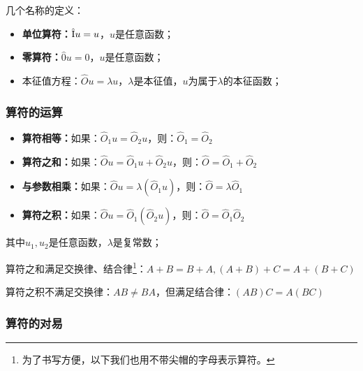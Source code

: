 几个名称的定义：

\begin{itemize}
    \item \textbf{单位算符：}$\hat {\rm I}u = u$，$u$是任意函数；
    \item \textbf{零算符：}$\hat 0u = 0$，$u$是任意函数；
    \item 本征值方程：$\hat O u = \lambda u$，$\lambda$是本征值，$u$为属于$\lambda$的本征函数；
\end{itemize}

\subsubsection{算符的运算}

\begin{itemize}
    \item \textbf{算符相等：}如果：$\hat O_1 u = \hat O_2 u$，则：$\hat O_1 = \hat O_2$
    \item \textbf{算符之和：}如果：$\hat O u = \hat O_1 u + \hat O_2 u$，则：$\hat O = \hat O_1 + \hat O_2$
    \item \textbf{与参数相乘：}如果：$\hat O u = \lambda (\hat O_1 u)$，则：$\hat O = \lambda \hat O_1$
    \item \textbf{算符之积：}如果：$\hat O u = \hat O_1 (\hat O_2 u)$，则：$\hat O = \hat O_1 \hat O_2$
\end{itemize}
其中$u_1 ,u_2 $是任意函数，$\lambda$是复常数；

算符之和满足交换律、结合律\footnote{为了书写方便，以下我们也用不带尖帽的字母表示算符。}：$A + B = B + A,\left( {A + B} \right) + C = A + \left( {B + C} \right)$

算符之积不满足交换律：$AB \ne BA$，但满足结合律：$\left( {AB} \right)C = A\left( {BC} \right)$

\subsubsection{算符的对易}

